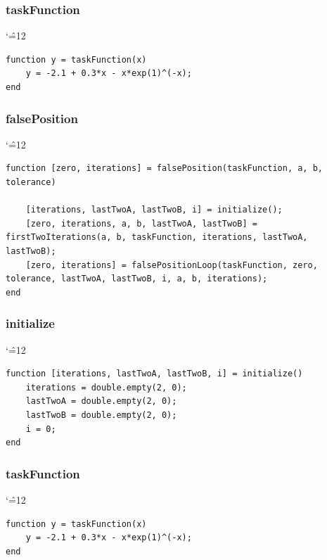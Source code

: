 \documentclass[12pt]{report}
\newenvironment{simplechar}{%
   \catcode`\^=12
}{}
\begin{document}
\subsubsection{taskFunction}
\begin{simplechar}
\begin{lstlisting}
function y = taskFunction(x)
    y = -2.1 + 0.3*x - x*exp(1)^(-x);
end
\end{lstlisting}
\end{simplechar}

\newpage
\subsubsection{falsePosition}
\begin{simplechar}
\begin{lstlisting}
function [zero, iterations] = falsePosition(taskFunction, a, b, tolerance)

    [iterations, lastTwoA, lastTwoB, i] = initialize();
    [zero, iterations, a, b, lastTwoA, lastTwoB] = firstTwoIterations(a, b, taskFunction, iterations, lastTwoA, lastTwoB);
    [zero, iterations] = falsePositionLoop(taskFunction, zero, tolerance, lastTwoA, lastTwoB, i, a, b, iterations);
end
\end{lstlisting}
\end{simplechar}

\subsubsection{initialize}
\begin{simplechar}
\begin{lstlisting}
function [iterations, lastTwoA, lastTwoB, i] = initialize()
    iterations = double.empty(2, 0);
    lastTwoA = double.empty(2, 0);
    lastTwoB = double.empty(2, 0);
    i = 0;
end
\end{lstlisting}
\end{simplechar}

\subsubsection{taskFunction}
\begin{simplechar}
\begin{lstlisting}
function y = taskFunction(x)
    y = -2.1 + 0.3*x - x*exp(1)^(-x);
end
\end{lstlisting}
\end{simplechar}

\newpage
\end{document}
